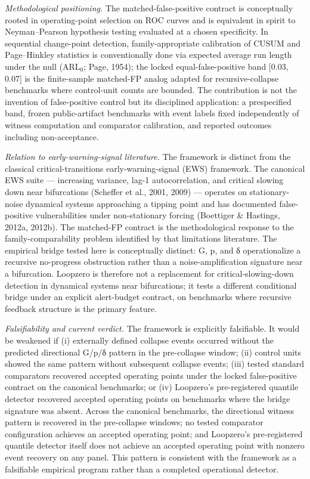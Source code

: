 \documentclass[
  11pt,
]{article}
\begin{document}
\emph{Methodological positioning.} The matched-false-positive contract
is conceptually rooted in operating-point selection on ROC curves and is
equivalent in spirit to Neyman--Pearson hypothesis testing evaluated at
a chosen specificity. In sequential change-point detection,
family-appropriate calibration of CUSUM and Page--Hinkley statistics is
conventionally done via expected average run length under the null
(\(\mathrm{ARL}_0\); Page, 1954); the locked equal-false-positive band
{[}0.03, 0.07{]} is the finite-sample matched-FP analog adapted for
recursive-collapse benchmarks where control-unit counts are bounded. The
contribution is not the invention of false-positive control but its
disciplined application: a prespecified band, frozen public-artifact
benchmarks with event labels fixed independently of witness computation
and comparator calibration, and reported outcomes including
non-acceptance.

\emph{Relation to early-warning-signal literature.} The framework is
distinct from the classical critical-transitions early-warning-signal
(EWS) framework. The canonical EWS suite --- increasing variance, lag-1
autocorrelation, and critical slowing down near bifurcations (Scheffer
et al., 2001, 2009) --- operates on stationary-noise dynamical systems
approaching a tipping point and has documented false-positive
vulnerabilities under non-stationary forcing (Boettiger \& Hastings,
2012a, 2012b). The matched-FP contract is the methodological response to
the family-comparability problem identified by that limitations
literature. The empirical bridge tested here is conceptually distinct:
G, p, and δ operationalize a recursive no-progress obstruction rather
than a noise-amplification signature near a bifurcation. Loopzero is
therefore not a replacement for critical-slowing-down detection in
dynamical systems near bifurcations; it tests a different conditional
bridge under an explicit alert-budget contract, on benchmarks where
recursive feedback structure is the primary feature.

\emph{Falsifiability and current verdict.} The framework is explicitly
falsifiable. It would be weakened if (i) externally defined collapse
events occurred without the predicted directional G/p/δ pattern in the
pre-collapse window; (ii) control units showed the same pattern without
subsequent collapse events; (iii) tested standard comparators recovered
accepted operating points under the locked false-positive contract on
the canonical benchmarks; or (iv) Loopzero's pre-registered quantile
detector recovered accepted operating points on benchmarks where the
bridge signature was absent. Across the canonical benchmarks, the
directional witness pattern is recovered in the pre-collapse windows; no
tested comparator configuration achieves an accepted operating point;
and Loopzero's pre-registered quantile detector itself does not achieve
an accepted operating point with nonzero event recovery on any panel.
This pattern is consistent with the framework as a falsifiable empirical
program rather than a completed operational detector.
\end{document}
